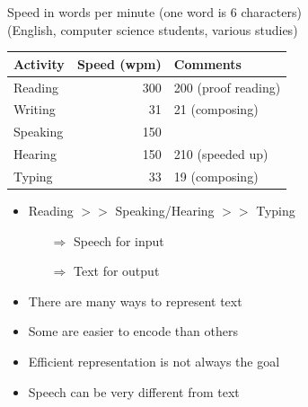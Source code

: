 \documentclass[a4paper,landscape,headrule,footrule,xetex]{foils}
\begin{document}

Speed in words per minute (one word is 6 characters)
\\ (English, computer science students, various studies)

\begin{tabular}{lrl}
 Activity           & Speed (wpm) & Comments \\ \hline
  Reading            & 300 & 200 (proof reading)\\
  Writing              & 31 & 21 (composing) \\ 
  Speaking             & 150 & \\
  Hearing              & 150 & 210 (speeded up)  \\
  Typing               & 33  & 19 (composing) 
\end{tabular}
\begin{itemize}
\item Reading $>>$ Speaking/Hearing $>>$ Typing
  \begin{itemize}
  \item[$\Rightarrow$] Speech for input
  \item[$\Rightarrow$] Text for output
  \end{itemize}
\end{itemize}





\begin{itemize}
\item There are many ways to represent text
\item Some are easier to encode than others
\item Efficient representation is not always the goal
\item Speech can be very different from text
\end{itemize}




\end{document}

